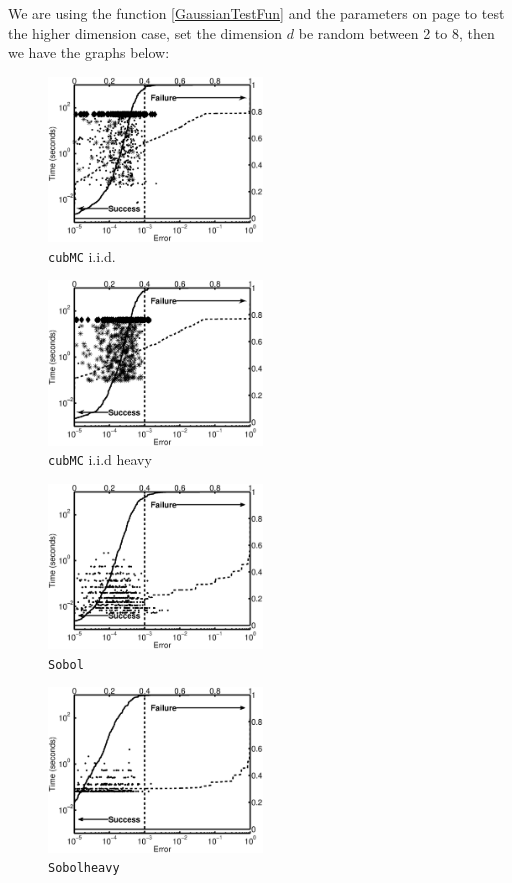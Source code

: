 \documentclass[graybox]{svmult}
\begin{document}
We are using the function \eqref{GaussianTestFun} and the parameters on page \pageref{FunPara} to test the higher dimension case, set the dimension $d$ be random between 2 to 8, then we have the graphs below:
\begin{figure}
\centering
\begin{minipage}{5.7cm} \centering \includegraphics[width=5.7cm]{gaussiand=7iidErrTime.eps} \\ {\tt cubMC} i.i.d. \end{minipage}
\begin{minipage}{5.7cm} \centering \includegraphics[width=5.7cm]{gaussiand=7iidheavyErrTime.eps} \\ {\tt cubMC} i.i.d heavy \end{minipage}
\begin{minipage}{5.7cm} \centering \includegraphics[width=5.7cm]{gaussiand=7SobolErrTime.eps} \\ {\tt Sobol} \end{minipage}
\begin{minipage}{5.7cm} \centering \includegraphics[width=5.7cm]{gaussiand=7SobolheavyErrTime.eps} \\ {\tt Sobolheavy} \end{minipage}

\end{figure}
\end{document}
